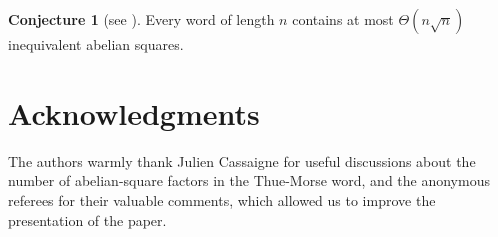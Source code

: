 \documentclass[11pt,reqno]{amsart}
\numberwithin{equation}{section}
\theoremstyle{plain}
\theoremstyle{definition}
\newtheorem{conjecture}[theorem]{Conjecture}
\theoremstyle{remark}
\begin{document}
\begin{conjecture}[see \cite{Ry14,warsaw2}]
 Every word of length $n$ contains at most $\Theta(n\sqrt{n})$ inequivalent abelian squares.
\end{conjecture}


\section{Acknowledgments}

The authors warmly thank Julien Cassaigne for useful discussions about the
number of abelian-square factors in the Thue-Morse word, and the anonymous referees for their valuable comments, which allowed us to improve the presentation of the paper.
\end{document}
